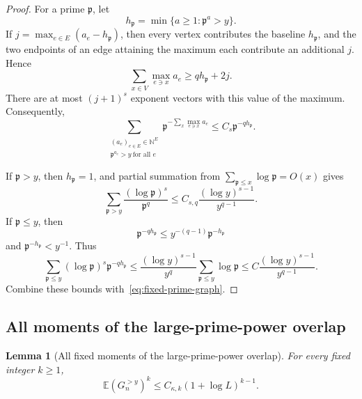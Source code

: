 \documentclass[11pt]{article}
\newtheorem{lemma}[theorem]{Lemma}
\theoremstyle{remark}
\newcommand{\Ee}{\mathbb E}
\begin{document}
\begin{proof}
For a prime $\mathfrak p$, let
\[
 h_{\mathfrak p}=\min\{a\ge1:\mathfrak p^a>y\}.
\]
If
$j=\max_{e\in E}(a_e-h_{\mathfrak p})$, then every vertex contributes the
baseline $h_{\mathfrak p}$, and the two endpoints of an edge attaining the
maximum each contribute an additional $j$.  Hence
\[
 \sum_{x\in V}\max_{e\ni x}a_e
 \ge qh_{\mathfrak p}+2j.
\]
There are at most $(j+1)^s$ exponent vectors with this value of the maximum.
Consequently,
\begin{equation}
\label{eq:fixed-prime-graph}
 \sum_{\substack{(a_e)_{e\in E}\in\mathbb N^E\\
                   \mathfrak p^{a_e}>y\ \text{for all }e}}
 \mathfrak p^{-\sum_x\max_{e\ni x}a_e}
 \le C_s\mathfrak p^{-qh_{\mathfrak p}}.
\end{equation}

If $\mathfrak p>y$, then $h_{\mathfrak p}=1$, and partial summation from
$\sum_{\mathfrak p\le x}\log\mathfrak p=O(x)$ gives
\[
 \sum_{\mathfrak p>y}\frac{(\log\mathfrak p)^s}{\mathfrak p^q}
 \le C_{s,q}\frac{(\log y)^{s-1}}{y^{q-1}}.
\]
If $\mathfrak p\le y$, then
\[
 \mathfrak p^{-qh_{\mathfrak p}}
 \le y^{-(q-1)}\mathfrak p^{-h_{\mathfrak p}}
\]
and $\mathfrak p^{-h_{\mathfrak p}}<y^{-1}$.  Thus
\[
 \sum_{\mathfrak p\le y}(\log\mathfrak p)^s
 \mathfrak p^{-qh_{\mathfrak p}}
 \le \frac{(\log y)^{s-1}}{y^q}
 \sum_{\mathfrak p\le y}\log\mathfrak p
 \le C\frac{(\log y)^{s-1}}{y^{q-1}}.
\]
Combine these bounds with~\eqref{eq:fixed-prime-graph}.
\end{proof}

\subsection{All moments of the large-prime-power overlap}

\begin{lemma}[All fixed moments of the large-prime-power overlap]
\label{lem:G-large-all-moments}
For every fixed integer $k\ge1$,
\begin{equation}
\label{eq:G-large-all-moments}
 \Ee(G_n^{>y})^k
 \le C_{\kappa,k}(1+\log L)^{k-1}.
\end{equation}
\end{lemma}
\end{document}
